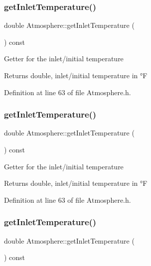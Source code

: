 \subsubsection{\texorpdfstring{get\+Inlet\+Temperature()}{getInletTemperature()}\hspace{0.1cm}{\footnotesize\ttfamily [1/3]}}
{\footnotesize\ttfamily double Atmosphere\+::get\+Inlet\+Temperature (\begin{DoxyParamCaption}{ }\end{DoxyParamCaption}) const\hspace{0.3cm}{\ttfamily [inline]}}

Getter for the inlet/initial temperature \begin{DoxyReturn}{Returns}
double, inlet/initial temperature in °F 
\end{DoxyReturn}


Definition at line 63 of file Atmosphere.\+h.

\mbox{\label{class_atmosphere_acb944a3a99cd40f0132713ce73e6ca4a}} 
\subsubsection{\texorpdfstring{get\+Inlet\+Temperature()}{getInletTemperature()}\hspace{0.1cm}{\footnotesize\ttfamily [2/3]}}
{\footnotesize\ttfamily double Atmosphere\+::get\+Inlet\+Temperature (\begin{DoxyParamCaption}{ }\end{DoxyParamCaption}) const\hspace{0.3cm}{\ttfamily [inline]}}

Getter for the inlet/initial temperature \begin{DoxyReturn}{Returns}
double, inlet/initial temperature in °F 
\end{DoxyReturn}


Definition at line 63 of file Atmosphere.\+h.

\mbox{\label{class_atmosphere_acb944a3a99cd40f0132713ce73e6ca4a}} 
\subsubsection{\texorpdfstring{get\+Inlet\+Temperature()}{getInletTemperature()}\hspace{0.1cm}{\footnotesize\ttfamily [3/3]}}
{\footnotesize\ttfamily double Atmosphere\+::get\+Inlet\+Temperature (\begin{DoxyParamCaption}{ }\end{DoxyParamCaption}) const\hspace{0.3cm}{\ttfamily [inline]}}

